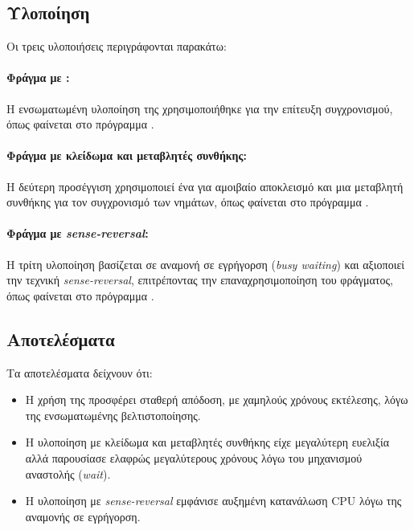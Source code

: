 \documentclass{article}
\begin{document}
\subsection*{Υλοποίηση} 
Οι τρεις υλοποιήσεις περιγράφονται παρακάτω:
\paragraph*{Φράγμα με :} Η ενσωματωμένη υλοποίηση της  χρησιμοποιήθηκε για την επίτευξη συγχρονισμού, όπως φαίνεται στο πρόγραμμα .
\paragraph*{Φράγμα με κλείδωμα και μεταβλητές συνθήκης:} Η δεύτερη προσέγγιση χρησιμοποιεί ένα  για αμοιβαίο αποκλεισμό και μια μεταβλητή συνθήκης  για τον συγχρονισμό των νημάτων, όπως φαίνεται στο πρόγραμμα .
\paragraph*{Φράγμα με \textit{sense-reversal}:} Η τρίτη υλοποίηση βασίζεται σε αναμονή σε εγρήγορση (\textit{busy waiting}) και αξιοποιεί την τεχνική \textit{sense-reversal}, επιτρέποντας την επαναχρησιμοποίηση του φράγματος, όπως φαίνεται στο πρόγραμμα .
\subsection*{Αποτελέσματα} 
Τα αποτελέσματα δείχνουν ότι: 
\begin{itemize} 
    \item Η χρήση της  προσφέρει σταθερή απόδοση, με χαμηλούς χρόνους εκτέλεσης, λόγω της ενσωματωμένης βελτιστοποίησης. 
    \item Η υλοποίηση με κλείδωμα και μεταβλητές συνθήκης είχε μεγαλύτερη ευελιξία αλλά παρουσίασε ελαφρώς μεγαλύτερους χρόνους λόγω του μηχανισμού αναστολής (\textit{wait}). 
    \item Η υλοποίηση με \textit{sense-reversal} εμφάνισε αυξημένη κατανάλωση CPU λόγω της αναμονής σε εγρήγορση. 
\end{itemize}
\end{document}

